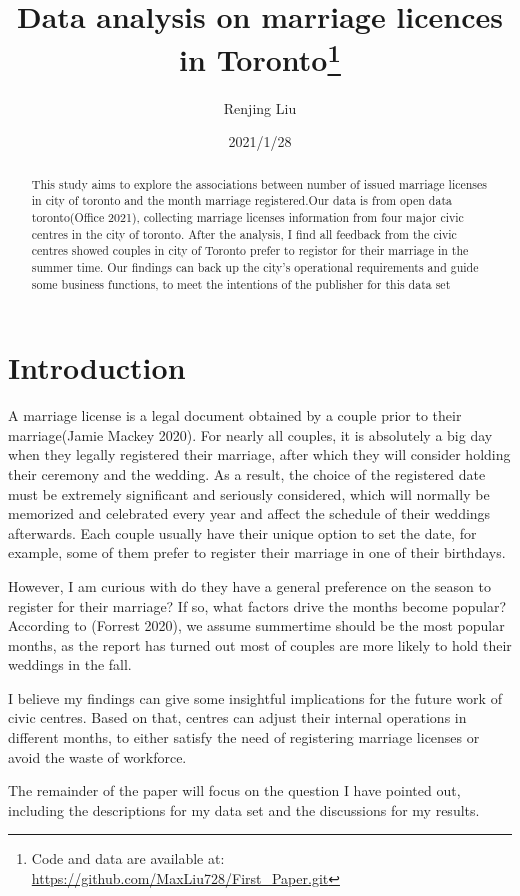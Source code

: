 \documentclass[
]{article}
\title{Data analysis on marriage licences in Toronto\thanks{Code and data are available at: \url{https://github.com/MaxLiu728/First_Paper.git}}}
\author{Renjing Liu}
\date{2021/1/28}
\begin{document}
\maketitle
\begin{abstract}
This study aims to explore the associations between number of issued marriage licenses in city of toronto and the month marriage registered.Our data is from open data toronto(Office 2021), collecting marriage licenses information from four major civic centres in the city of toronto. After the analysis, I find all feedback from the civic centres showed couples in city of Toronto prefer to registor for their marriage in the summer time. Our findings can back up the city's operational requirements and guide some business functions, to meet the intentions of the publisher for this data set
\end{abstract}

\hypertarget{introduction}{%
\section{Introduction}\label{introduction}}

A marriage license is a legal document obtained by a couple prior to their marriage(Jamie Mackey 2020). For nearly all couples, it is absolutely a big day when they legally registered their marriage, after which they will consider holding their ceremony and the wedding. As a result, the choice of the registered date must be extremely significant and seriously considered, which will normally be memorized and celebrated every year and affect the schedule of their weddings afterwards. Each couple usually have their unique option to set the date, for example, some of them prefer to register their marriage in one of their birthdays.

However, I am curious with do they have a general preference on the season to register for their marriage? If so, what factors drive the months become popular? According to (Forrest 2020), we assume summertime should be the most popular months, as the report has turned out most of couples are more likely to hold their weddings in the fall.

I believe my findings can give some insightful implications for the future work of civic centres. Based on that, centres can adjust their internal operations in different months, to either satisfy the need of registering marriage licenses or avoid the waste of workforce.

The remainder of the paper will focus on the question I have pointed out, including the descriptions for my data set and the discussions for my results.
\end{document}
